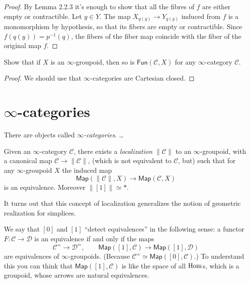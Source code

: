 \begin{proof}
By Lemma 2.2.3 it's enough to show that all the fibres of
$f$ are either empty or contractible.
Let $y \in Y$. The map $X_{q(y)}\to Y_{q(y)}$ induced from $f$ 
is a monomorphism by hypothesis, so that its fibers
are empty or contractible. Since $f(q(y))=p^{-1}(q)$,
the fibers of the fiber map coincide with the fiber of the 
original map $f$.
\end{proof}

\begin{exercise}[2.9]
\label{exercise-2.9}
Show that if $X$ is an $\infty$-groupoid,
then so is $\mathsf{Fun}(\mathcal{C},X)$ 
for any $\infty$-category $\mathcal{C}$.
\end{exercise}

\begin{proof}
We should use that
$\infty$-categories are Cartesian closed.
\end{proof}

\section{$\infty$-categories}
\label{section-infty-categories}

\noindent
There are objects called {\it $\infty$-categories}. …

\medskip\noindent
Given an $\infty$-category $\mathcal{C}$, there exists
a {\it localization} $\|\mathcal{C}\|$ to an
$\infty$-groupoid, with a canonical map
$\mathcal{C} \to \|\mathcal{C}\|$,
(which is not equivalent to $\mathcal{C}$, but)
such that for any $\infty$-groupoid $X$ 
the induced map
$$
\mathsf{Map}(\|\mathcal{C}\|,X) \to \mathsf{Map}(\mathcal{C},X)
$$
is an equivalence.
Moreover  $\|[1]\|\simeq *$.

It turns out that this concept of localization
generalizes the notion of geometric realization
for simplices.

\medskip\noindent
We say that $[0]$ and $[1]$ ``detect equivalences''
in the following sense:
a functor $F: \mathcal{C} \to \mathcal{D}$ is
an equivalence if and only if the maps
$$
\mathcal{C}^{\simeq} \to \mathcal{D}^{\simeq},\qquad 
\mathsf{Map}([1],\mathcal{C})\to\mathsf{Map}([1],\mathcal{D})
$$
are equivalences of $\infty$-groupoids.
(Because $\mathcal{C}^\simeq \simeq \mathsf{Map}([0], \mathcal{C})$.)
To understand this you can think that
$\mathsf{Map}([1],\mathcal{C})$ is like
the space of all $\mathop{\mathrm{Hom}}\nolimits$s, which is a groupoid,
whose arrows are natural equivalences.

